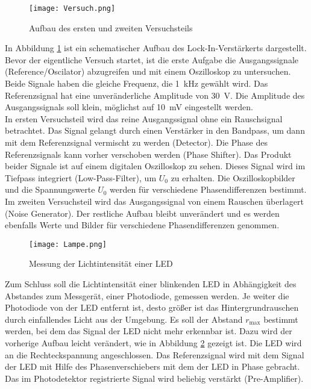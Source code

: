 \begin{figure}[h!] 
	\texttt{[image: Versuch.png]}
\caption[Aufbau des ersten und zweiten versuchteils]{Aufbau des ersten und zweiten Versuchsteils \footenotemark}
	\label{versuch}
\end{figure}	

In Abbildung \ref{versuch} ist ein schematischer Aufbau des Lock-In-Verstärkerts dargestellt.  \\
Bevor der eigentliche Versuch startet, ist die erste Aufgabe die Ausgangssignale (Reference/Oscilator) abzugreifen und mit einem Oszilloskop zu untersuchen. Beide Signale haben die gleiche Frequenz, die  \SI{1}{\kilo\hertz} gewählt wird. Das Referenzsignal hat eine unveränderliche Amplitude von \SI{30}{\volt}. Die Amplitude des Ausgangssignals soll klein, möglichst auf \SI{10}{\milli\volt} eingestellt werden. \\
In ersten Versuchsteil wird das reine Ausgangssignal ohne ein Rauschsignal betrachtet. Das Signal gelangt durch einen Verstärker in den Bandpass, um dann mit dem Referenzsignal vermischt zu werden (Detector). Die Phase des Referenzsignals kann vorher verschoben werden (Phase Shifter). Das Produkt beider Signale ist auf einem digitalen Oszilloskop zu sehen. Dieses Signal wird im Tiefpass integriert (Low-Pass-Filter), um $U_0$ zu erhalten. Die Oszilloskopbilder und die Spannungswerte $U_0$ werden für verschiedene Phasendifferenzen bestimmt. \\
Im zweiten Versuchsteil wird das Ausgangssignal von einem Rauschen überlagert (Noise Generator). Der restliche Aufbau bleibt unverändert und es werden ebenfalls Werte und Bilder für verschiedene Phasendifferenzen genommen. \\
\begin{figure}[h!]
	\texttt{[image: Lampe.png]}
	\caption{Messung der Lichtintensität einer LED\protect\footnotemark}
	\label{lampe}
\end{figure}	
	
Zum Schluss soll die Lichtintensität einer blinkenden LED in Abhängigkeit des Abstandes zum Messgerät, einer Photodiode, gemessen werden. Je weiter die Photodiode von der LED entfernt ist, desto größer ist das Hintergrundrauschen durch einfallendes Licht aus der Umgebung. Es soll der Abstand $r_\text{max}$ bestimmt werden, bei dem das Signal der LED nicht mehr erkennbar ist. Dazu wird der vorherige Aufbau leicht verändert, wie in Abbildung \ref{lampe} gezeigt ist. Die LED wird an die Rechteckspannung angeschlossen. Das Referenzsignal wird mit dem Signal der LED mit Hilfe des Phasenverschiebers  mit dem der LED in Phase gebracht. Das im Photodetektor registrierte Signal wird beliebig verstärkt (Pre-Amplifier).
